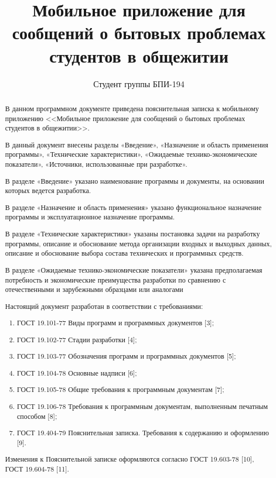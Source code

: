 \documentclass{../includes/TechDoc}
\title{Мобильное приложение для сообщений о бытовых проблемах студентов в общежитии}
\author{Студент группы БПИ-194}{В. А. Анненков}
\begin{document}
    \maketitle

    \begin{abstract}
        В данном программном документе приведена пояснительная записка к мобильному приложению <<Мобильное приложение для сообщений о бытовых проблемах студентов в общежитии>>.

        В данный документ внесены разделы «Введение», «Назначение и область применения программы», «Технические характеристики», «Ожидаемые технико-экономические показатели», «Источники, использованные при разработке».

        В разделе «Введение» указано наименование программы и документы, на основании которых ведется разработка.

        В разделе «Назначение и область применения» указано функциональное назначение программы и эксплуатационное назначение программы.

        В разделе «Технические характеристики» указаны постановка задачи на разработку программы, описание и обоснование метода организации входных и выходных данных, описание и обоснование выбора состава технических и программных средств.

        В разделе «Ожидаемые технико-экономические показатели» указана предполагаемая потребность и экономические преимущества разработки по сравнению с отечественными и зарубежными образцами или аналогами

        Настоящий документ разработан в соответствии с требованиями:
        \begin{enumerate}
            \item ГОСТ 19.101-77 Виды программ и программных документов [3];
            \item ГОСТ 19.102-77 Стадии разработки [4];
            \item ГОСТ 19.103-77 Обозначения программ и программных документов [5];
            \item ГОСТ 19.104-78 Основные надписи [6];
            \item ГОСТ 19.105-78 Общие требования к программным документам [7];
            \item ГОСТ 19.106-78 Требования к программным документам, выполненным печатным способом [8];
            \item ГОСТ 19.404-79 Пояснительная записка.
            Требования к содержанию и оформлению [9].
        \end{enumerate}
        Изменения к Пояснительной записке оформляются согласно ГОСТ 19.603-78 [10], ГОСТ 19.604-78 [11].
    \end{abstract}
\end{document}
